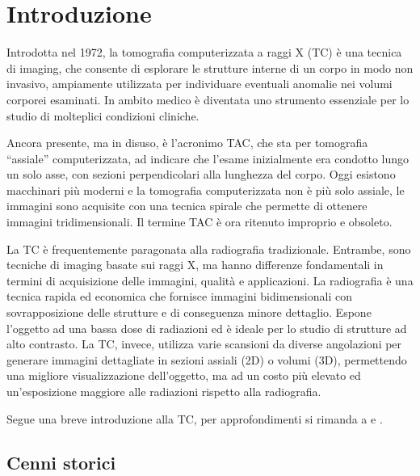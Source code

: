 \documentclass[12pt,a4paper]{report}
\begin{document}
\pagestyle{fancy}
\tableofcontents
\clearpage

\pagestyle{fancy}
\newpage
{}

\chapter{Introduzione}

Introdotta nel 1972, la tomografia computerizzata a raggi X (TC) è una tecnica di imaging, che consente di esplorare le strutture
interne di un corpo in modo non invasivo, ampiamente utilizzata per individuare eventuali anomalie nei volumi corporei esaminati.
In ambito medico è diventata uno strumento essenziale per lo studio di molteplici condizioni cliniche.

Ancora presente, ma in disuso, è l'acronimo TAC, che sta per tomografia ``assiale'' computerizzata, ad indicare che l'esame
inizialmente era condotto lungo un solo asse, con sezioni perpendicolari alla lunghezza del corpo.
Oggi esistono macchinari più moderni e la tomografia computerizzata non è più solo assiale, le immagini sono acquisite con una
tecnica spirale che permette di ottenere immagini tridimensionali.
Il termine TAC è ora ritenuto improprio e obsoleto.

La TC è frequentemente paragonata alla radiografia tradizionale.
Entrambe, sono tecniche di imaging basate sui raggi X, ma hanno differenze fondamentali in termini di acquisizione delle immagini,
qualità e applicazioni.
La radiografia è una tecnica rapida ed economica che fornisce immagini bidimensionali con sovrapposizione delle strutture e di
conseguenza minore dettaglio.
Espone l'oggetto ad una bassa dose di radiazioni ed è ideale per lo studio di strutture ad alto contrasto.
La TC, invece, utilizza varie scansioni da diverse angolazioni per generare immagini dettagliate in sezioni assiali (2D) o volumi
(3D), permettendo una migliore visualizzazione dell'oggetto, ma ad un costo più elevato ed un'esposizione maggiore alle radiazioni
rispetto alla radiografia.

Segue una breve introduzione alla TC, per approfondimenti si rimanda a \cite{Faggioni2011} e \cite{MoroLoli2021}.

\section{Cenni storici}
\end{document}
